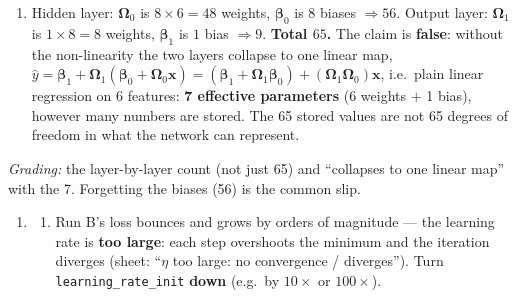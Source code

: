 \documentclass[
  11pt,
]{article}
\providecommand{\tightlist}{%
  \setlength{\itemsep}{0pt}\setlength{\parskip}{0pt}}
\begin{document}
\begin{solutionbox}

\begin{enumerate}
\def\labelenumi{(\alph{enumi})}
\tightlist
\item
  Hidden layer: \(\boldsymbol\Omega_0\) is \(8\times6 = 48\) weights,
  \(\boldsymbol\beta_0\) is \(8\) biases \(\Rightarrow 56\). Output
  layer: \(\boldsymbol\Omega_1\) is \(1\times8 = 8\) weights,
  \(\boldsymbol\beta_1\) is \(1\) bias \(\Rightarrow 9\). \textbf{Total
  \(65\).} The claim is \textbf{false}: without the non-linearity the
  two layers collapse to one linear map,
  \(\hat y = \boldsymbol\beta_1 + \boldsymbol\Omega_1(\boldsymbol\beta_0 + \boldsymbol\Omega_0\mathbf x)
  = (\boldsymbol\beta_1 + \boldsymbol\Omega_1\boldsymbol\beta_0) + (\boldsymbol\Omega_1\boldsymbol\Omega_0)\mathbf x\),
  i.e.~plain linear regression on 6 features: \textbf{7 effective
  parameters} (6 weights \(+\) 1 bias), however many numbers are stored.
  The 65 stored values are not 65 degrees of freedom in what the network
  can represent.
\end{enumerate}

\emph{Grading:} the layer-by-layer count (not just 65) and ``collapses
to one linear map'' with the 7. Forgetting the biases (56) is the common
slip.

\begin{enumerate}
\def\labelenumi{(\alph{enumi})}
\setcounter{enumi}{1}
\tightlist
\item
  \begin{enumerate}
  \def\labelenumii{(\roman{enumii})}
  \tightlist
  \item
    Run B's loss bounces and grows by orders of magnitude --- the
    learning rate is \textbf{too large}: each step overshoots the
    minimum and the iteration diverges (sheet: ``\(\eta\) too large: no
    convergence / diverges''). Turn \texttt{learning\_rate\_init}
    \textbf{down} (e.g.~by \(10\times\) or \(100\times\)).
  \end{enumerate}
\end{enumerate}


\end{solutionbox}
\end{document}
